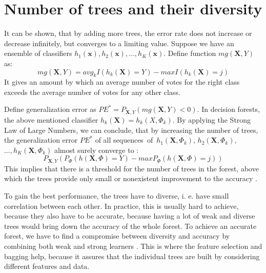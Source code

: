 \documentclass[thesis=B,english]{FITthesis}[2012/10/20]
\begin{document}
	\section{Number of trees and their diversity}
	It can be shown, that by adding more trees, the error rate does not increase or decrease infinitely, but converges to a limiting value. Suppose we have an ensemble of classifiers \(h_1(\textbf{x}), h_2(\textbf{x}),\dots,h_K(\textbf{x})\). Define function \(\textit{mg}(\mathbf{X},Y)\) as:
	\[\textit{mg}(\mathbf{X},Y)=\textit{avg}_kI(h_k(\mathbf{X})=Y)-\textit{max}I(h_k(\mathbf{X})=j)\] It gives an amount by which an average number of votes for the right class exceeds the average number of votes for any other class. 

	Define generalization error as \(PE^*=P_{\mathbf{X},Y}(\textit{mg}(\mathbf{X},Y) < 0)\). In decision forests, the above mentioned classifier \(h_k(\textbf{X})=h_k(X, \Phi_k)\). By applying the Strong Law of Large Numbers, we can conclude, that by increasing the number of trees, the generalization error \(PE^*\) of all sequences~of~\(h_1(\mathbf{X},\Phi_k)\), \(h_2(\mathbf{X}, \Phi_k)\),~\(\dots, h_K(\mathbf{X}, \Phi_k)\) almost surely converge to \cite{BR01}:
	\[
	P_{\mathbf{X},Y}(P_{\Phi}(h(\mathbf{X}, \Phi)=Y)-\textit{max}P_{\Phi}(h(\mathbf{X}, \Phi)=j))
	\]
	This implies that there is a threshold for the number of trees in the forest, above which the trees provide only small or nonexistent improvement to the accuracy \cite{SELECTION_OF_DT}.
	
	To gain the best performance, the trees have to diverse, i. e. have small correlation between each other. In practice, this is usually hard to achieve, because they also have to be accurate, because having a lot of weak and diverse trees would bring down the accuracy of the whole forest. To achieve an accurate forest, we have to find a compromise between diversity and accuracy by combining both weak and strong learners \cite{ENSEMBLE}. This is where the feature selection and bagging help, because it assures that the individual trees are built by considering different features and data.
\end{document}
